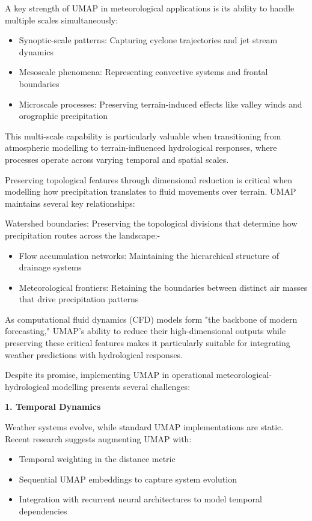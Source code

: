 \documentclass{article}
\begin{document}
A key strength of UMAP in meteorological applications is its ability to handle multiple scales simultaneously:
\begin{itemize}
	\item		Synoptic-scale patterns: Capturing cyclone trajectories and jet stream dynamics
	\item		Mesoscale phenomena: Representing convective systems and frontal boundaries
	\item		Microscale processes: Preserving terrain-induced effects like valley winds and orographic precipitation
	\end{itemize}

This multi-scale capability is particularly valuable when transitioning from atmospheric modelling to terrain-influenced hydrological responses, where processes operate across varying temporal and spatial scales.\par

Preserving topological features through dimensional reduction is critical when modelling how precipitation translates to fluid movements over terrain. UMAP maintains several key relationships:\par

Watershed boundaries: Preserving the topological divisions that determine how precipitation routes across the landscape:-

\begin{itemize}
	\item		Flow accumulation networks: Maintaining the hierarchical structure of drainage systems
	\item		Meteorological frontiers: Retaining the boundaries between distinct air masses that drive precipitation patterns
\end{itemize}

As computational fluid dynamics (CFD) models form "the backbone of modern forecasting," UMAP's ability to reduce their high-dimensional outputs while preserving these critical features makes it particularly suitable for integrating weather predictions with hydrological responses.\par

Despite its promise, implementing UMAP in operational meteorological-hydrological modelling presents several challenges:


\textbf{1. Temporal Dynamics}

Weather systems evolve, while standard UMAP implementations are static. Recent research suggests augmenting UMAP with:
\begin{itemize}
	\item		Temporal weighting in the distance metric
	\item		Sequential UMAP embeddings to capture system evolution
	\item		Integration with recurrent neural architectures to model temporal dependencies
\end{itemize}
\end{document}
